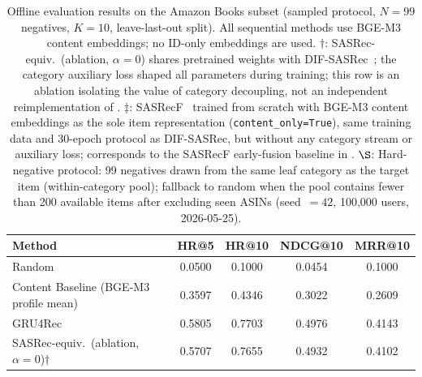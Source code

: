 
\begin{table}[ht]
\centering
\caption{%
  Offline evaluation results on the Amazon Books subset
  (sampled protocol, $N{=}99$ negatives, $K{=}10$, leave-last-out split).
  All sequential methods use BGE-M3 content embeddings; no ID-only embeddings are used.
  $\dagger$: SASRec-equiv.\ (ablation, $\alpha{=}0$) shares pretrained weights with
  DIF-SASRec~\cite{xie2022difsasrec}; the category auxiliary loss shaped all parameters
  during training; this row is an ablation isolating the value of category decoupling,
  not an independent reimplementation of \citet{kang2018self}.
  $\ddagger$: SASRecF~\cite{kang2018self} trained from scratch with BGE-M3 content
  embeddings as the sole item representation (\texttt{content\_only=True}), same training
  data and 30-epoch protocol as DIF-SASRec, but without any category stream or auxiliary
  loss; corresponds to the SASRecF early-fusion baseline in \citet{xie2022difsasrec}.
  $\S$: Hard-negative protocol: 99 negatives drawn from the same leaf category as the
  target item (within-category pool); fallback to random when the pool contains fewer than
  200 available items after excluding seen ASINs (seed~$=42$, 100{,}000 users, 2026-05-25).
}
\label{tab:comparison}
\begin{tabular}{lcccc}
\hline
\textbf{Method} & \textbf{HR@5} & \textbf{HR@10} & \textbf{NDCG@10} & \textbf{MRR@10} \\
\hline
Random & 0.0500 & 0.1000 & 0.0454 & 0.1000 \\
\hline
Content Baseline (BGE-M3 profile mean)  & 0.3597 & 0.4346 & 0.3022 & 0.2609 \\
GRU4Rec~\cite{hidasi2016gru4rec}        & 0.5805 & 0.7703 & 0.4976 & 0.4143 \\
SASRec-equiv.~(ablation, $\alpha{=}0$)$\dagger$  & 0.5707 & 0.7655 & 0.4932 & 0.4102 \\

\end{tabular}
\end{table}
